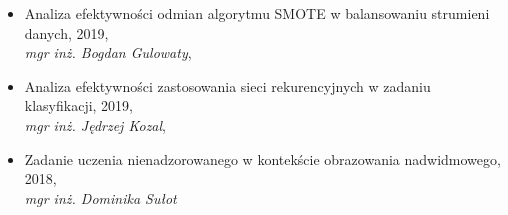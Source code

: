 \begin{itemize}
	\item Analiza efektywności odmian algorytmu SMOTE w balansowaniu strumieni danych, 2019,\\\emph{mgr inż. Bogdan Gulowaty},
	\item Analiza efektywności zastosowania sieci rekurencyjnych w zadaniu klasyfikacji, 2019,\\\emph{mgr inż. Jędrzej Kozal},
	\item Zadanie uczenia nienadzorowanego w kontekście obrazowania nadwidmowego, 2018,\\\emph{mgr inż. Dominika Sułot}
\end{itemize}


